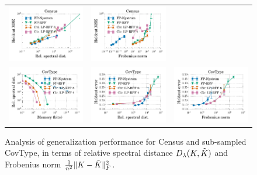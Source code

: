 \begin{figure}
\begin{tabular}{@{\hskip -0.1in}c@{\hskip -0.1in}c@{\hskip -0.1in}c@{\hskip -0.1in}}
		\includegraphics[width=0.33\linewidth]{figures/regression_l2_vs_delta.pdf} &
		\includegraphics[width=0.33\linewidth]{figures/regression_l2_vs_f_norm.pdf} \\
		\includegraphics[width=0.33\linewidth]{figures/classification_delta_vs_mem.pdf} &
		\includegraphics[width=0.33\linewidth]{figures/classification_acc_vs_delta.pdf}&
		\includegraphics[width=0.33\linewidth]{figures/classification_acc_vs_f_norm.pdf}
	\end{tabular}
	\caption{Analysis of generalization performance for Census and sub-sampled CovType, in terms of relative spectral distance $D_{\lambda}(K,\tilde{K})$ and Frobenius norm $\frac{1}{n^2}\|K-\tilde{K}\|_F^2$.
	}
	\label{fig:specdist}
\end{figure}

